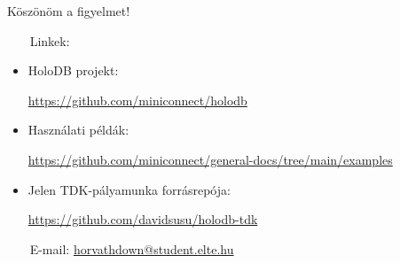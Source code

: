 \documentclass[
    aspectratio=169,
]{beamer}
\begin{document}
\begin{frame}
    \vspace{1em}
    
    \centering
    
    { \Huge Köszönöm a figyelmet! }
    
    \vspace{3em}
    
    \hspace*{\fill}%
    \begin{minipage}[c]{0.75\textwidth}
        \begin{flushleft}
            \normalsize
            
            ~~~
            {\color{beamer@blendedblue}Linkek:}
            
            \vspace{0.5em}
            
            \footnotesize
            
            \begin{itemize}
                \item HoloDB projekt: \par
                    \url{https://github.com/miniconnect/holodb}
                \item Használati példák: \par
                    \scriptsize{\url{https://github.com/miniconnect/general-docs/tree/main/examples}}
                \item Jelen TDK-pályamunka forrásrepója: \par
                    \url{https://github.com/davidsusu/holodb-tdk}
            \end{itemize}
            
            \vspace{1.5em}
            
            \normalsize
            
            ~~~
            { \color{beamer@blendedblue} E-mail: }
            \href{mailto:horvathdown@student.elte.hu}{horvathdown@student.elte.hu}
        \end{flushleft}
    \end{minipage}%
    \hspace*{\fill}%
    \begin{minipage}[c]{0.24\textwidth}
    \end{minipage}%
    \hspace*{\fill}%
\end{frame}
\end{document}
